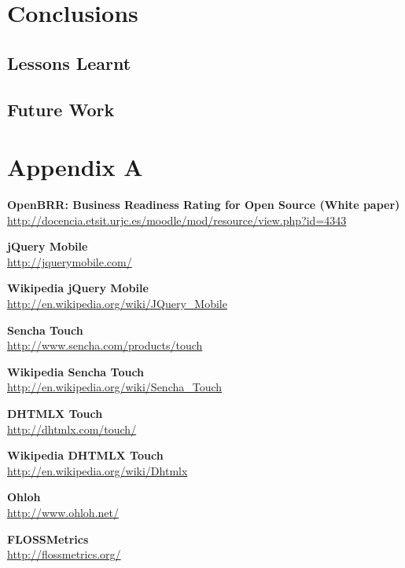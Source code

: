 \documentclass[a4paper,12pt]{book}
\begin{document}

\chapter{Conclusions}
\label{chap:conclusions}


\section{Lessons Learnt}
\label{sec:lessons}


\section{Future Work}
\label{sec:future}


\appendix
\chapter{Appendix A}
\label{app:appenda}

\begin{thebibliography}{25}
 

\textbf{OpenBRR: Business Readiness Rating for
Open Source (White paper)}\\
{\footnotesize\url{
http://docencia.etsit.urjc.es/moodle/mod/resource/view.php?id=4343}}

\textbf{jQuery Mobile}\\
{\footnotesize\url{http://jquerymobile.com/}}

\textbf{Wikipedia jQuery Mobile}\\
{\footnotesize\url{http://en.wikipedia.org/wiki/JQuery_Mobile}}

\textbf{Sencha Touch}\\
{\footnotesize\url{http://www.sencha.com/products/touch}}

\textbf{Wikipedia Sencha Touch}\\
{\footnotesize\url{http://en.wikipedia.org/wiki/Sencha_Touch}}

\textbf{DHTMLX Touch}\\
{\footnotesize\url{http://dhtmlx.com/touch/}}

\textbf{Wikipedia DHTMLX Touch}\\
{\footnotesize\url{http://en.wikipedia.org/wiki/Dhtmlx}}

\textbf{Ohloh}\\
{\footnotesize\url{http://www.ohloh.net/}}

\textbf{FLOSSMetrics}\\
{\footnotesize\url{http://flossmetrics.org/}}

\end{thebibliography}
\end{document}

